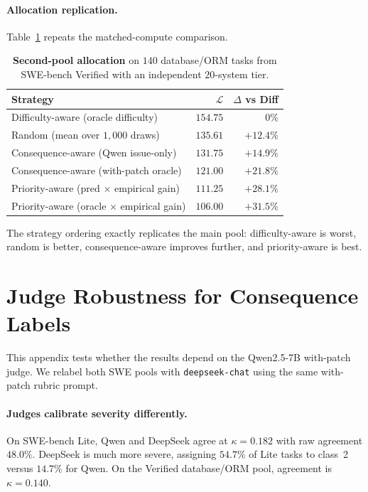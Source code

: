 \documentclass{article}
\begin{document}
\paragraph{Allocation replication.}
Table~\ref{tab:seconddomain} repeats the matched-compute comparison.

\begin{table}[h]
\centering
\caption{\textbf{Second-pool allocation} on $140$ database/ORM tasks
from SWE-bench Verified with an independent $20$-system tier.}
\label{tab:seconddomain}
\small
\begin{tabular}{lrr}
\toprule
Strategy & $\mathcal{L}$ & $\Delta$ vs Diff \\
\midrule
Difficulty-aware (oracle difficulty) & $154.75$ & $0\%$ \\
Random (mean over $1{,}000$ draws) & $135.61$ & $+12.4\%$ \\
Consequence-aware (Qwen issue-only) & $131.75$ & $+14.9\%$ \\
Consequence-aware (with-patch oracle) & $121.00$ & $+21.8\%$ \\
Priority-aware (pred $\times$ empirical gain) & $111.25$ & $+28.1\%$ \\
Priority-aware (oracle $\times$ empirical gain) & $\mathbf{106.00}$ & $\mathbf{+31.5\%}$ \\
\bottomrule
\end{tabular}
\end{table}

The strategy ordering exactly replicates the main pool:
difficulty-aware is worst, random is better, consequence-aware improves
further, and priority-aware is best.

\section{Judge Robustness for Consequence Labels}
\label{app:judge2}

This appendix tests whether the results depend on the Qwen2.5-7B
with-patch judge. We relabel both SWE pools with
\texttt{deepseek-chat} using the same with-patch rubric prompt.

\paragraph{Judges calibrate severity differently.}
On SWE-bench Lite, Qwen and DeepSeek agree at $\kappa=0.182$ with raw
agreement $48.0\%$. DeepSeek is much more severe, assigning $54.7\%$
of Lite tasks to class~2 versus $14.7\%$ for Qwen. On the Verified
database/ORM pool, agreement is $\kappa=0.140$.
\end{document}
